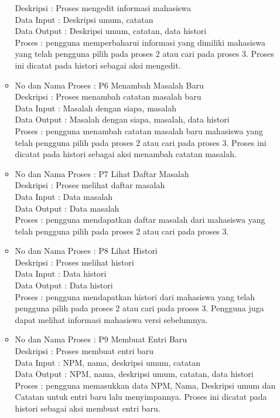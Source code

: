 \begin{enumerate}[(1)]
\begin{itemize}
Deskripsi : Proses mengedit informasi mahasiswa\\
Data Input : Deskripsi umum, catatan\\
Data Output : Deskripsi umum, catatan, data histori\\
Proses : pengguna memperbaharui informasi yang dimiliki mahasiswa yang telah pengguna pilih pada proses 2 atau cari pada proses 3. Proses ini dicatat pada histori sebagai aksi mengedit.
\item No dan Nama Proses : P6 Menambah Masalah Baru\\
Deskripsi : Proses menambah catatan masalah baru\\
Data Input : Masalah dengan siapa, masalah\\
Data Output : Masalah dengan siapa, masalah, data histori\\
Proses : pengguna menambah catatan masalah baru mahasiswa yang telah pengguna pilih pada proses 2 atau cari pada proses 3. Proses ini dicatat pada histori sebagai aksi menambah catatan masalah.
\item No dan Nama Proses : P7 Lihat Daftar Masalah\\
Deskripsi : Proses melihat daftar masalah\\
Data Input : Data masalah\\
Data Output : Data masalah\\
Proses : pengguna mendapatkan daftar masalah dari mahasiswa yang telah pengguna pilih pada proses 2 atau cari pada proses 3.
\item No dan Nama Proses : P8 Lihat Histori\\
Deskripsi : Proses melihat histori\\
Data Input : Data histori\\
Data Output : Data histori\\
Proses : pengguna mendapatkan histori dari mahasiswa yang telah pengguna
pilih pada proses 2 atau cari pada proses 3. Pengguna juga dapat melihat informasi mahasiswa versi sebelumnya.
\item No dan Nama Proses : P9 Membuat Entri Baru\\
Deskripsi : Proses membuat entri baru\\
Data Input : NPM, nama, deskripsi umum, catatan\\
Data Output : NPM, nama, deskripsi umum, catatan, data histori\\
Proses : pengguna memasukkan data NPM, Nama, Deskripsi umum dan Catatan untuk entri baru lalu menyimpannya. Proses ini dicatat pada histori sebagai aksi membuat entri baru.
\end{itemize}  
\end{enumerate}